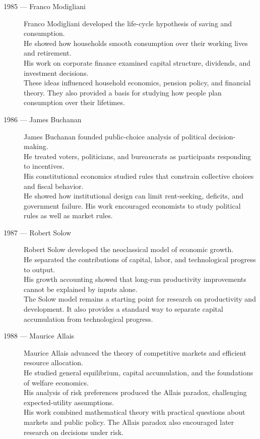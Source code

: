 \documentclass[12pt]{report}
\begin{document}
{\begin{description}
\item[1985 --- Franco Modigliani]
Franco Modigliani developed the life-cycle hypothesis of saving and consumption.\\
He showed how households smooth consumption over their working lives and retirement.\\
His work on corporate finance examined capital structure, dividends, and investment decisions.\\
These ideas influenced household economics, pension policy, and financial theory. They also provided a basis for studying how people plan consumption over their lifetimes.

\item[1986 --- James Buchanan]
James Buchanan founded public-choice analysis of political decision-making.\\
He treated voters, politicians, and bureaucrats as participants responding to incentives.\\
His constitutional economics studied rules that constrain collective choices and fiscal behavior.\\
He showed how institutional design can limit rent-seeking, deficits, and government failure. His work encouraged economists to study political rules as well as market rules.

\item[1987 --- Robert Solow]
Robert Solow developed the neoclassical model of economic growth.\\
He separated the contributions of capital, labor, and technological progress to output.\\
His growth accounting showed that long-run productivity improvements cannot be explained by inputs alone.\\
The Solow model remains a starting point for research on productivity and development. It also provides a standard way to separate capital accumulation from technological progress.

\item[1988 --- Maurice Allais]
Maurice Allais advanced the theory of competitive markets and efficient resource allocation.\\
He studied general equilibrium, capital accumulation, and the foundations of welfare economics.\\
His analysis of risk preferences produced the Allais paradox, challenging expected-utility assumptions.\\
His work combined mathematical theory with practical questions about markets and public policy. The Allais paradox also encouraged later research on decisions under risk.


\end{description}}
\end{document}

